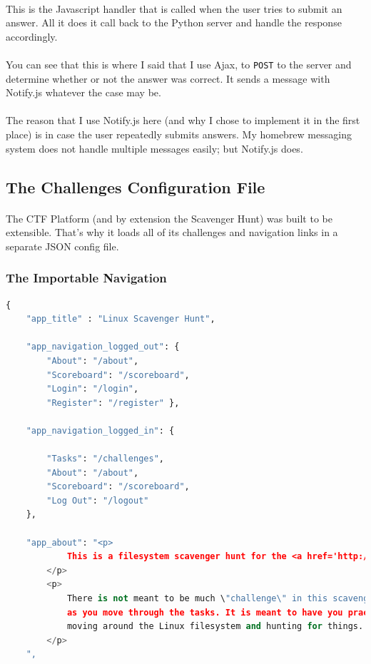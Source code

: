 \documentclass[11pt]{article}
\begin{document}
	\paragraph{} This is the Javascript handler that is called when the user tries to submit an answer. All it does it call back to the Python server and handle the response accordingly.

	\paragraph{} You can see that this is where I said that I use Ajax, to \texttt{POST} to the server and determine whether or not the answer was correct. It sends a message with Notify.js whatever the case may be.

	\paragraph{} The reason that I use Notify.js here (and why I chose to implement it in the first place) is in case the user repeatedly submits answers. My homebrew messaging system does not handle multiple messages easily; but Notify.js does.

	\newpage

	\subsection{The Challenges Configuration File}

	\paragraph{} The CTF Platform (and by extension the Scavenger Hunt) was built to be extensible. That's why it loads all of its challenges and navigation links in a separate JSON config file.

	\subsubsection{The Importable Navigation}


\begin{lstlisting}[language=python]
{
	"app_title" : "Linux Scavenger Hunt",

	"app_navigation_logged_out": {		
		"About": "/about",
		"Scoreboard": "/scoreboard",
		"Login": "/login",
		"Register": "/register" },

	"app_navigation_logged_in": {

		"Tasks": "/challenges",
		"About": "/about",
		"Scoreboard": "/scoreboard",
		"Log Out": "/logout"
	},

	"app_about": "<p>
			This is a filesystem scavenger hunt for the <a href='http://uscga.edu'>United States Coast Guard Academy</a> 2016 Intro to Linux class!
		</p>
		<p>
			There is not meant to be much \"challenge\" in this scavenger hunt ... but the difficulty should increase 
			as you move through the tasks. It is meant to have you practice and really start to master
			moving around the Linux filesystem and hunting for things.
		</p>
	",
\end{lstlisting}
\end{document}
